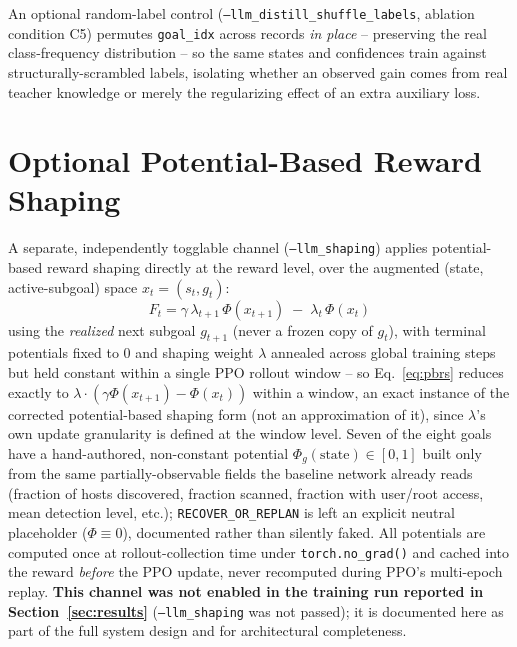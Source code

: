 \documentclass[11pt]{article}
\newcommand{\code}[1]{\texttt{#1}}
\begin{document}
An optional random-label control (\code{--llm\_distill\_shuffle\_labels}, ablation
condition C5) permutes \code{goal\_idx} across records \emph{in place} -- preserving
the real class-frequency distribution -- so the same states and confidences train
against structurally-scrambled labels, isolating whether an observed gain comes from
real teacher knowledge or merely the regularizing effect of an extra auxiliary loss.

\section{Optional Potential-Based Reward Shaping}
\label{sec:shaping}

A separate, independently togglable channel (\code{--llm\_shaping}) applies
potential-based reward shaping directly at the reward level, over the augmented
(state, active-subgoal) space $x_t = (s_t, g_t)$:
\begin{equation}
F_t = \gamma\, \lambda_{t+1}\, \Phi(x_{t+1}) \;-\; \lambda_t\, \Phi(x_t)
\label{eq:pbrs}
\end{equation}
using the \emph{realized} next subgoal $g_{t+1}$ (never a frozen copy of $g_t$), with
terminal potentials fixed to 0 and shaping weight $\lambda$ annealed across global
training steps but held constant within a single PPO rollout window -- so
Eq.~\ref{eq:pbrs} reduces exactly to $\lambda \cdot (\gamma \Phi(x_{t+1}) -
\Phi(x_t))$ within a window, an exact instance of the corrected potential-based
shaping form (not an approximation of it), since $\lambda$'s own update granularity
is defined at the window level. Seven of the eight goals have a hand-authored,
non-constant potential $\Phi_g(\text{state}) \in [0,1]$ built only from the same
partially-observable fields the baseline network already reads (fraction of hosts
discovered, fraction scanned, fraction with user/root access, mean detection level,
etc.); \code{RECOVER\_OR\_REPLAN} is left an explicit neutral placeholder
($\Phi \equiv 0$), documented rather than silently faked. All potentials are computed
once at rollout-collection time under \code{torch.no\_grad()} and cached into the
reward \emph{before} the PPO update, never recomputed during PPO's multi-epoch
replay. \textbf{This channel was not enabled in the training run reported in
Section~\ref{sec:results}} (\code{--llm\_shaping} was not passed); it is documented
here as part of the full system design and for architectural completeness.
\end{document}
